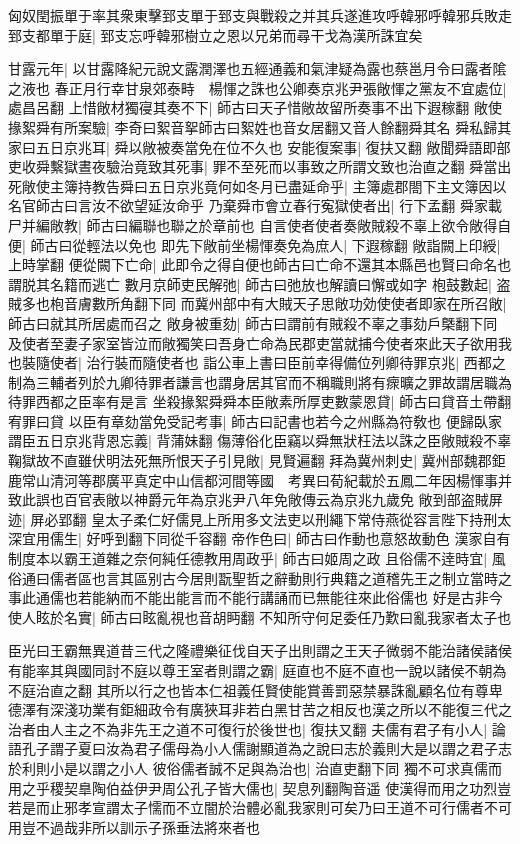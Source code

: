 匈奴閏振單于率其衆東擊郅支單于郅支與戰殺之并其兵遂進攻呼韓邪呼韓邪兵敗走郅支都單于庭|{
	郅支忘呼韓邪樹立之恩以兄弟而尋干戈為漢所誅宜矣}


甘露元年|{
	以甘露降紀元說文露潤澤也五經通義和氣津疑為露也蔡邕月令曰露者隂之液也}
春正月行幸甘泉郊泰畤　楊惲之誅也公卿奏京兆尹張敞惲之黨友不宜處位|{
	處昌呂翻}
上惜敞材獨寑其奏不下|{
	師古曰天子惜敞故留所奏事不出下遐稼翻}
敞使掾絮舜有所案驗|{
	李奇曰絮音挐師古曰絮姓也音女居翻又音人餘翻舜其名}
舜私歸其家曰五日京兆耳|{
	舜以敞被奏當免在位不久也}
安能復案事|{
	復扶又翻}
敞聞舜語即部吏收舜繫獄晝夜驗治竟致其死事|{
	罪不至死而以事致之所謂文致也治直之翻}
舜當出死敞使主簿持教告舜曰五日京兆竟何如冬月已盡延命乎|{
	主簿處郡閤下主文簿因以名官師古曰言汝不欲望延汝命乎}
乃棄舜市會立春行寃獄使者出|{
	行下孟翻}
舜家載尸并編敞教|{
	師古曰編聯也聯之於章前也}
自言使者使者奏敞賊殺不辜上欲令敞得自便|{
	師古曰從輕法以免也}
即先下敞前坐楊惲奏免為庶人|{
	下遐稼翻}
敞詣闕上印綬|{
	上時掌翻}
便從闕下亡命|{
	此即令之得自便也師古曰亡命不還其本縣邑也賢曰命名也謂脱其名籍而逃亡}
數月京師吏民解弛|{
	師古曰弛放也解讀曰懈或如字}
枹鼓數起|{
	盗賊多也枹音膚數所角翻下同}
而冀州部中有大賊天子思敞功効使使者即家在所召敞|{
	師古曰就其所居處而召之}
敞身被重劾|{
	師古曰謂前有賊殺不辜之事劾戶槩翻下同}
及使者至妻子家室皆泣而敞獨笑曰吾身亡命為民郡吏當就捕今使者來此天子欲用我也裝隨使者|{
	治行裝而隨使者也}
詣公車上書曰臣前幸得備位列卿待罪京兆|{
	西都之制為三輔者列於九卿待罪者謙言也謂身居其官而不稱職則將有瘝曠之罪故謂居職為待罪西都之臣率有是言}
坐殺掾絮舜舜本臣敞素所厚吏數蒙恩貸|{
	師古曰貸音土帶翻宥罪曰貸}
以臣有章劾當免受記考事|{
	師古曰記書也若今之州縣為符敎也}
便歸臥家謂臣五日京兆背恩忘義|{
	背蒲妹翻}
傷薄俗化臣竊以舜無狀枉法以誅之臣敞賊殺不辜鞠獄故不直雖伏明法死無所恨天子引見敞|{
	見賢遍翻}
拜為冀州刺史|{
	冀州部魏郡鉅鹿常山清河等郡廣平真定中山信都河間等國　考異曰荀紀載於五鳳二年因楊惲事并致此誤也百官表敞以神爵元年為京兆尹八年免敞傳云為京兆九歲免}
敞到部盗賊屏迹|{
	屏必郢翻}
皇太子柔仁好儒見上所用多文法吏以刑繩下常侍燕從容言陛下持刑太深宜用儒生|{
	好呼到翻下同從千容翻}
帝作色曰|{
	師古曰作動也意怒故動色}
漢家自有制度本以霸王道雜之奈何純任德教用周政乎|{
	師古曰姬周之政}
且俗儒不逹時宜|{
	風俗通曰儒者區也言其區别古今居則翫聖哲之辭動則行典籍之道稽先王之制立當時之事此通儒也若能納而不能出能言而不能行講誦而已無能往來此俗儒也}
好是古非今使人眩於名實|{
	師古曰眩亂視也音胡眄翻}
不知所守何足委任乃歎曰亂我家者太子也

臣光曰王霸無異道昔三代之隆禮樂征伐自天子出則謂之王天子微弱不能治諸侯諸侯有能率其與國同討不庭以尊王室者則謂之霸|{
	庭直也不庭不直也一說以諸侯不朝為不庭治直之翻}
其所以行之也皆本仁祖義任賢使能賞善罰惡禁暴誅亂顧名位有尊卑德澤有深淺功業有鉅細政令有廣狹耳非若白黑甘苦之相反也漢之所以不能復三代之治者由人主之不為非先王之道不可復行於後世也|{
	復扶又翻}
夫儒有君子有小人|{
	論語孔子謂子夏曰汝為君子儒母為小人儒謝顯道為之說曰志於義則大是以謂之君子志於利則小是以謂之小人}
彼俗儒者誠不足與為治也|{
	治直吏翻下同}
獨不可求真儒而用之乎稷契臯陶伯益伊尹周公孔子皆大儒也|{
	契息列翻陶音遥}
使漢得而用之功烈豈若是而止邪孝宣謂太子懦而不立闇於治體必亂我家則可矣乃曰王道不可行儒者不可用豈不過哉非所以訓示子孫垂法將來者也

